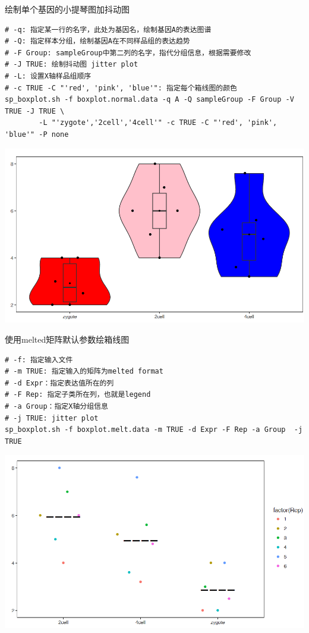 \documentclass[]{article}
\numberwithin{figure}{section}
\numberwithin{table}{section}
\theoremstyle{definition}
\theoremstyle{definition}
\theoremstyle{definition}
\theoremstyle{remark}
\begin{document}
绘制单个基因的小提琴图加抖动图

\begin{verbatim}
# -q: 指定某一行的名字，此处为基因名，绘制基因A的表达图谱
# -Q: 指定样本分组，绘制基因A在不同样品组的表达趋势
# -F Group: sampleGroup中第二列的名字，指代分组信息，根据需要修改
# -J TRUE: 绘制抖动图 jitter plot
# -L: 设置X轴样品组顺序
# -c TRUE -C "'red', 'pink', 'blue'": 指定每个箱线图的颜色
sp_boxplot.sh -f boxplot.normal.data -q A -Q sampleGroup -F Group -V TRUE -J TRUE \
        -L "'zygote','2cell','4cell'" -c TRUE -C "'red', 'pink', 'blue'" -P none
\end{verbatim}

\begin{center}\includegraphics[width=0.95\linewidth,height=0.7\textheight,keepaspectratio]{images/boxplot_8} \end{center}

使用melted矩阵默认参数绘箱线图

\begin{verbatim}
# -f: 指定输入文件
# -m TRUE: 指定输入的矩阵为melted format
# -d Expr：指定表达值所在的列
# -F Rep: 指定子类所在列，也就是legend 
# -a Group：指定X轴分组信息
# -j TRUE: jitter plot
sp_boxplot.sh -f boxplot.melt.data -m TRUE -d Expr -F Rep -a Group  -j TRUE
\end{verbatim}

\begin{center}\includegraphics[width=0.95\linewidth,height=0.7\textheight,keepaspectratio]{images/boxplot_9} \end{center}
\end{document}
